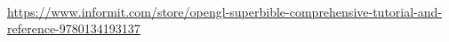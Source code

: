 \documentclass[calcdimensions,landscape,letterpaper]{powersem}
\newcommand{\thecurrentheading}{}
\newcommand{\heading}[1]{\renewcommand{\thecurrentheading}{#1}}
\begin{document}
\begin{slide}
  \heading{References: OpenGL Superbible}
  \begin{center}
    \\
    {\small \url{https://www.informit.com/store/opengl-superbible-comprehensive-tutorial-and-reference-9780134193137}}
  \end{center}
\end{slide}
\end{document}
